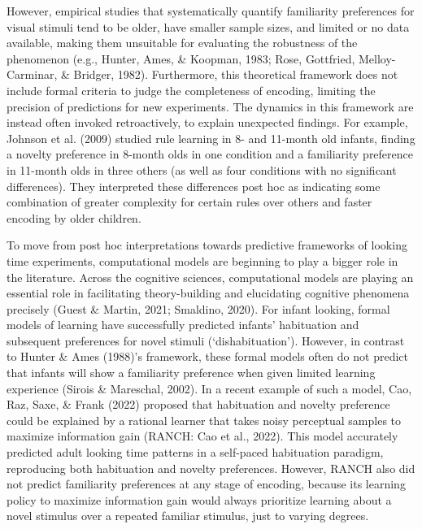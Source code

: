 \documentclass[10pt, letterpaper]{article}
\begin{document}
However, empirical studies that systematically quantify familiarity
preferences for visual stimuli tend to be older, have smaller sample
sizes, and limited or no data available, making them unsuitable for
evaluating the robustness of the phenomenon (e.g., Hunter, Ames, \&
Koopman, 1983; Rose, Gottfried, Melloy-Carminar, \& Bridger, 1982).
Furthermore, this theoretical framework does not include formal criteria
to judge the completeness of encoding, limiting the precision of
predictions for new experiments. The dynamics in this framework are
instead often invoked retroactively, to explain unexpected findings. For
example, Johnson et al. (2009) studied rule learning in 8- and 11-month
old infants, finding a novelty preference in 8-month olds in one
condition and a familiarity preference in 11-month olds in three others
(as well as four conditions with no significant differences). They
interpreted these differences post hoc as indicating some combination of
greater complexity for certain rules over others and faster encoding by
older children.

To move from post hoc interpretations towards predictive frameworks of
looking time experiments, computational models are beginning to play a
bigger role in the literature. Across the cognitive sciences,
computational models are playing an essential role in facilitating
theory-building and elucidating cognitive phenomena precisely (Guest \&
Martin, 2021; Smaldino, 2020). For infant looking, formal models of
learning have successfully predicted infants' habituation and subsequent
preferences for novel stimuli (`dishabituation'). However, in contrast
to Hunter \& Ames (1988)'s framework, these formal models often do not
predict that infants will show a familiarity preference when given
limited learning experience (Sirois \& Mareschal, 2002). In a recent
example of such a model, Cao, Raz, Saxe, \& Frank (2022) proposed that
habituation and novelty preference could be explained by a rational
learner that takes noisy perceptual samples to maximize information gain
(RANCH: Cao et al., 2022). This model accurately predicted adult looking
time patterns in a self-paced habituation paradigm, reproducing both
habituation and novelty preferences. However, RANCH also did not predict
familiarity preferences at any stage of encoding, because its learning
policy to maximize information gain would always prioritize learning
about a novel stimulus over a repeated familiar stimulus, just to
varying degrees.
\end{document}
